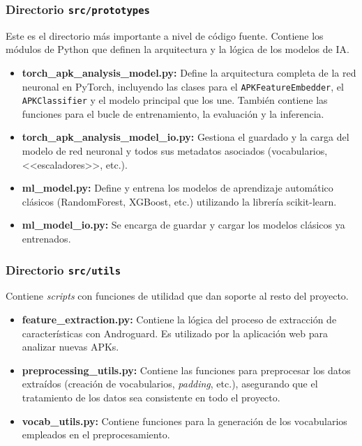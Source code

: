 \subsubsection{Directorio \texttt{src/prototypes}}
Este es el directorio más importante a nivel de código fuente. Contiene los módulos de Python que definen la arquitectura y la lógica de los modelos de IA.
\begin{itemize}
	\item \textbf{torch\_apk\_analysis\_model.py:} Define la arquitectura completa de la red neuronal en PyTorch, incluyendo las clases para el \texttt{APKFeatureEmbedder}, el \texttt{APKClassifier} y el modelo principal que los une. También contiene las funciones para el bucle de entrenamiento, la evaluación y la inferencia.
	
	\item \textbf{torch\_apk\_analysis\_model\_io.py:} Gestiona el guardado y la carga del modelo de red neuronal y todos sus metadatos asociados (vocabularios, <<escaladores>>, etc.).
	
	\item \textbf{ml\_model.py:} Define y entrena los modelos de aprendizaje automático clásicos (RandomForest, XGBoost, etc.) utilizando la librería scikit-learn.
	
	\item \textbf{ml\_model\_io.py:} Se encarga de guardar y cargar los modelos clásicos ya entrenados.
\end{itemize}

\subsubsection{Directorio \texttt{src/utils}}
Contiene \textit{scripts} con funciones de utilidad que dan soporte al resto del proyecto.
\begin{itemize}
	\item \textbf{feature\_extraction.py:} Contiene la lógica del proceso de extracción de características con Androguard. Es utilizado por la aplicación web para analizar nuevas APKs.
	
	\item \textbf{preprocessing\_utils.py:} Contiene las funciones para preprocesar los datos extraídos (creación de vocabularios, \textit{padding}, etc.), asegurando que el tratamiento de los datos sea consistente en todo el proyecto.
	
	\item  \textbf{vocab\_utils.py:} Contiene funciones para la generación de los vocabularios empleados en el preprocesamiento.
\end{itemize}

